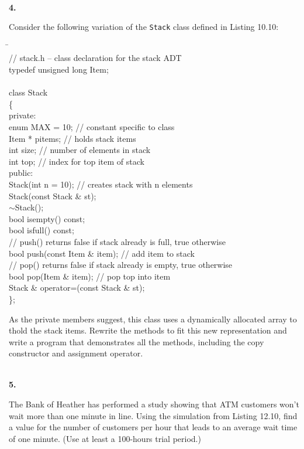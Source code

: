 \documentclass[10 pt]{amsart}
\newlength{\cwidth}
\newenvironment{cpart}[2][\cwidth]
	{%
		\\ %
		\textbf{#2. }%
		\begin{minipage}[t]{#1}%
		\setlength{\parindent}{0pt}%
		\setlength{\parskip}{2ex}%
	}
	{%
		\end{minipage}%
	}
\newcommand{\ttt}[1]{\texttt{#1}}
\begin{document}
	\begin{cpart}{4}
		Consider the following variation of the \ttt{Stack} class 
		defined in Listing 10.10:
		{\ttfamily
			\begin{tabbing}
				\phantom{\qquad}\=\hspace{4cm}\= \\
				// stack.h -- class declaration for the stack ADT \\
				typedef unsigned long Item; \\
				\\
				class Stack \\
				\{ \\
				private: 
				\+ \\
				enum {MAX = 10}; \> // constant specific to class \\
				Item * pitems; \> // holds stack items \\
				int size; \> // number of elements in stack \\
				int top; \> // index for top item of stack \\
				\< public: \\
				Stack(int n = 10); \> // creates stack with n elements \\
				Stack(const Stack & st); \\
				$\sim$Stack(); \\
				bool isempty() const; \\
				bool isfull() const; \\
				// push() returns false if stack already is full,
					true otherwise \\
				bool push(const Item \& item); // add item to stack \\
				// pop() returns false if stack already is empty, 
					true otherwise \\
				bool pop(Item \& item); // pop top into item \\
				Stack & operator=(const Stack \& st); \\
				\< \};
			\end{tabbing}
		}		
		As the private members suggest, this class uses a dynamically
		allocated array to thold the stack items.
		Rewrite the methods to fit this new representation and 	
		write a program that demonstrates all the methods, including
		the copy constructor and assignment operator.
	\end{cpart}

	\begin{cpart}{5}
		The Bank of Heather has performed a study showing that ATM 
		customers won't wait more than one minute in line.
		Using the simulation from Listing 12.10, find a value for
		the number of customers per hour that leads to an
		average wait time of one minute. 
		(Use at least a 100-hours trial period.)
	\end{cpart}
\end{document}
